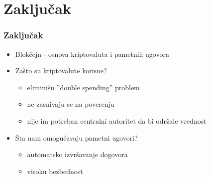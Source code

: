 \documentclass{beamer}
\begin{document}
\section{Zaključak}

\begin{frame}[fragile]\frametitle{Zaključak}
	\begin{itemize}
        \item Blokčejn - osnova kriptovaluta i pametnih ugovora
	    \item Zašto su kriptovalute korisne?
        \begin{itemize}
            \item eliminišu ''double spending'' problem
            \item ne zasnivaju se na poverenju
            \item nije im potreban centralni autoritet da bi održale vrednost
            \end{itemize}
        \item Šta nam omogućavaju pametni ugovori?
        \begin{itemize}
            \item automatsko izvršavanje dogovora
            \item visoku bezbednost
        \end{itemize}
	\end{itemize}
\end{frame}
\end{document}
